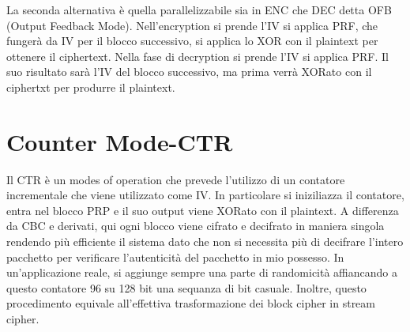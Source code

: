 \documentclass{article}
\begin{document}
La seconda alternativa è quella parallelizzabile sia in ENC che DEC detta OFB (Output Feedback Mode). Nell'encryption si prende l'IV si applica PRF, che fungerà da IV per il blocco successivo, si applica lo XOR con il plaintext per ottenere il ciphertext. Nella fase di decryption si prende l'IV si applica PRF\@. Il suo risultato sarà l'IV del blocco successivo, ma prima verrà XORato con il ciphertxt per produrre il plaintext.
\section{Counter Mode-CTR}
Il CTR è un modes of operation che prevede l'utilizzo di un contatore incrementale che viene utilizzato come IV\@. In particolare si iniziliazza il contatore, entra nel blocco PRP e il suo output viene XORato con il plaintext\@. A differenza da CBC e derivati, qui ogni blocco viene cifrato e decifrato in maniera singola rendendo più efficiente il sistema dato che non si necessita più di decifrare l'intero pacchetto per verificare l'autenticità del pacchetto in mio possesso\@. \newline
In un'applicazione reale, si aggiunge sempre una parte di randomicità affiancando a questo contatore 96 su 128 bit una sequanza di bit casuale\@. Inoltre, questo procedimento equivale all'effettiva trasformazione dei block cipher in stream cipher\@.
\end{document}
